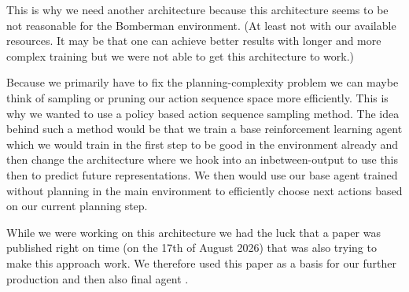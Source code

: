 \documentclass[article, 10pt]{IEEEtran}
\begin{document}
This is why we need another architecture because this architecture seems to be not reasonable for the Bomberman environment. (At least not with our available resources. It may be that one can achieve better results with longer and more complex training but we were not able to get this architecture to work.)

Because we primarily have to fix the planning-complexity problem we can maybe think of sampling or pruning our action sequence space more efficiently. This is why we wanted to use a policy based action sequence sampling method. The idea behind such a method would be that we train a base reinforcement learning agent which we would train in the first step to be good in the environment already and then change the architecture where we hook into an inbetween-output to use this then to predict future representations. We then would use our base agent trained without planning in the main environment to efficiently choose next actions based on our current planning step.

While we were working on this architecture we had the luck that a paper was published right on time (on the 17th of August 2026) that was also trying to make this approach work. We therefore used this paper as a basis for our further production and then also final agent \cite{dong2026qwm}.


\end{document}
